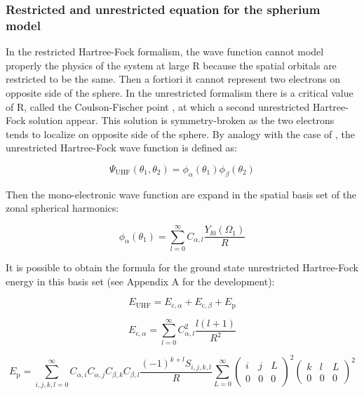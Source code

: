 \documentclass[11pt,a4paper]{article}
\begin{document}
\subsubsection{Restricted and unrestricted equation for the  spherium model}

In the restricted Hartree-Fock formalism, the wave function cannot model properly the physics of the system at large R because the spatial orbitals are restricted to be the same. Then a fortiori it cannot represent two electrons on opposite side of the sphere. In the unrestricted formalism there is a critical value of R, called the Coulson-Fischer point \cite{Coulson_1949}, at which a second unrestricted Hartree-Fock solution appear. This solution is symmetry-broken as the two electrons tends to localize on opposite side of the sphere. By analogy with the case of  \cite{SzaboBook}, the unrestricted Hartree-Fock wave function is defined as:

\begin{equation}
\Psi_{\text{UHF}}(\theta_1,\theta_2)=\phi_\alpha(\theta_1)\phi_\beta(\theta_2)
\end{equation}

Then the mono-electronic wave function are expand in the spatial basis set of the zonal spherical harmonics:

\begin{equation}
\phi_\alpha(\theta_1)=\sum\limits_{l=0}^{\infty}C_{\alpha,l}\frac{Y_{l0}(\Omega_1)}{R}
\end{equation}

It is possible to obtain the formula for the ground state unrestricted Hartree-Fock energy in this basis set (see Appendix A for the development):

\begin{equation}
E_{\text{UHF}} = E_{\text{c},\alpha} + E_{\text{c},\beta} + E_{\text{p}}
\end{equation}

\begin{equation}
E_{\text{c},\alpha} = \sum\limits_{l=0}^{\infty} C_{\alpha,l}^2 \frac{l(l+1)}{R^2}
\end{equation}

\begin{equation}
E_{\text{p}} = \sum\limits_{i,j,k,l=0}^{\infty}C_{\alpha,i}C_{\alpha,j}C_{\beta,k}C_{\beta,l} \frac{(-1)^{k+l}S_{i,j,k,l}}{R}\sum\limits_{L=0}^{\infty} \begin{pmatrix}
 i & j & L \\
 0 & 0 & 0
\end{pmatrix}^2 \begin{pmatrix}
 k & l & L \\
 0 & 0 & 0
\end{pmatrix}^2
\label{eq:EUHF}
\end{equation}
\end{document}
